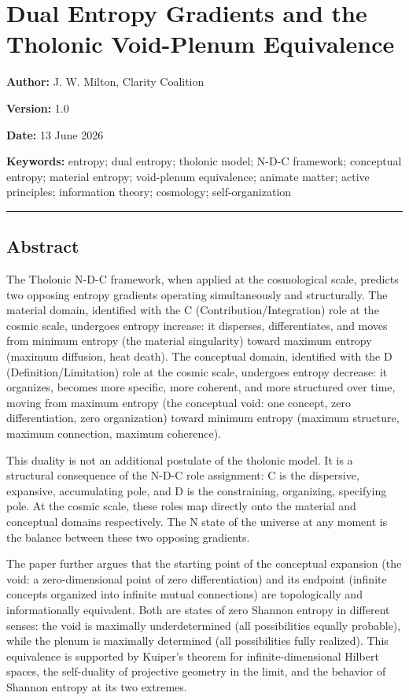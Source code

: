 \documentclass[
  11pt,
  letterpaper,
]{article}
\author{}
\date{}
\begin{document}
\section{Dual Entropy Gradients and the Tholonic Void-Plenum
Equivalence}\label{dual-entropy-gradients-and-the-tholonic-void-plenum-equivalence}

\textbf{Author:} J. W. Milton, Clarity Coalition

\textbf{Version:} 1.0

\textbf{Date:} 13 June 2026

\textbf{Keywords:} entropy; dual entropy; tholonic model; N-D-C
framework; conceptual entropy; material entropy; void-plenum
equivalence; animate matter; active principles; information theory;
cosmology; self-organization

\begin{center}\rule{0.5\linewidth}{0.5pt}\end{center}

\subsection{Abstract}\label{abstract}

The Tholonic N-D-C framework, when applied at the cosmological scale,
predicts two opposing entropy gradients operating simultaneously and
structurally. The material domain, identified with the C
(Contribution/Integration) role at the cosmic scale, undergoes entropy
increase: it disperses, differentiates, and moves from minimum entropy
(the material singularity) toward maximum entropy (maximum diffusion,
heat death). The conceptual domain, identified with the D
(Definition/Limitation) role at the cosmic scale, undergoes entropy
decrease: it organizes, becomes more specific, more coherent, and more
structured over time, moving from maximum entropy (the conceptual void:
one concept, zero differentiation, zero organization) toward minimum
entropy (maximum structure, maximum connection, maximum coherence).

This duality is not an additional postulate of the tholonic model. It is
a structural consequence of the N-D-C role assignment: C is the
dispersive, expansive, accumulating pole, and D is the constraining,
organizing, specifying pole. At the cosmic scale, these roles map
directly onto the material and conceptual domains respectively. The N
state of the universe at any moment is the balance between these two
opposing gradients.

The paper further argues that the starting point of the conceptual
expansion (the void: a zero-dimensional point of zero differentiation)
and its endpoint (infinite concepts organized into infinite mutual
connections) are topologically and informationally equivalent. Both are
states of zero Shannon entropy in different senses: the void is
maximally underdetermined (all possibilities equally probable), while
the plenum is maximally determined (all possibilities fully realized).
This equivalence is supported by Kuiper's theorem for
infinite-dimensional Hilbert spaces, the self-duality of projective
geometry in the limit, and the behavior of Shannon entropy at its two
extremes.
\end{document}
